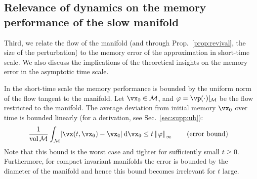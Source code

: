 \documentclass{article} %
\newcounter{ct}
\newcommand{\dm}[1]{\ensuremath{\mathrm{d}{#1}}} %
\newcommand{\manifold}{\mathcal{M}}
\newcommand{\uniformNorm}[1]{\left\|#1\right\|_\infty} %
\DeclarePairedDelimiter{\abs}{\lvert}{\rvert}
\theoremstyle{definition}
\theoremstyle{remark}
\begin{document}
\subsection{Relevance of dynamics on the memory performance of the slow manifold}\label{sec:attractor_bif}

Third, we relate the flow of the manifold (and through Prop.~\ref{prop:revival}, the size of the perturbation) to the memory error of the approximation in short-time scale. 
We also discuss the implications of the theoretical insights on the memory error in the asymptotic time scale.

In the short-time scale the memory performance is bounded by the uniform norm of the flow tangent to the manifold.
Let \(\vx_0 \in \manifold\), and \(\varphi = \vp(\cdot)\vert_\manifold\) be the flow restricted to the manifold.
The average deviation from initial memory \(\vx_0\) over time is bounded linearly (for a derivation, see Sec.~\ref{sec:supp:ub}):
\begin{align}\label{eq:distance:ub}
\frac{1}{\operatorname{vol}\manifold}\int_\manifold
\abs{\vx(t, \vx_0) - \vx_0}\,
\dm{\vx_0}
\leq t\uniformNorm{\varphi}
\qquad
\text{(error bound)}
\end{align}
Note that this bound is the worst case and tighter for sufficiently small $t \geq 0$.
Furthermore, for compact invariant manifolds the error is bounded by the diameter of the manifold and hence this bound becomes irrelevant for \(t\) large.
\end{document}
